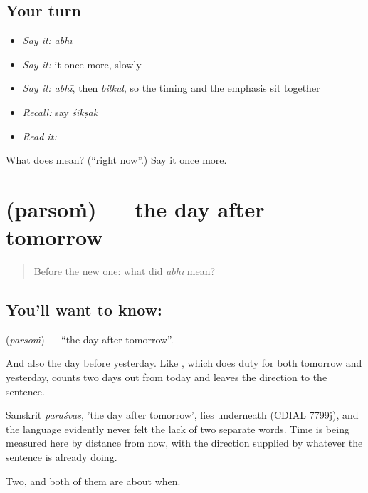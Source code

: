 \subsection*{Your turn}
\begin{itemize}
\raggedright
  \item \emph{Say it:} \emph{abhī}
  \item \emph{Say it:} it once more, slowly
  \item \emph{Say it:} \emph{abhī}, then \emph{bilkul}, so the timing and the emphasis sit together
  \item \emph{Recall:} say \emph{śikṣak}
  \item \emph{Read it:} \textbf{}
\end{itemize}

\begin{tcolorbox}[breakable,colback=teal!4,colframe=teal!35!black,title={Before you move on}]
What does  mean? (\textquotedblleft{}right now\textquotedblright{}.) Say it once more.
\end{tcolorbox}
\section[\texorpdfstring{\hi{परसों} (parsoṁ)}{परसों (parsoṁ)}]{ (parsoṁ) — the day after tomorrow}

\label{lesson:HI-C49-day-after}



\begin{quote}
Before the new one: what did \emph{abhī} mean?
\end{quote}

\subsection*{You'll want to know: }
\textbf{} (\emph{parsoṁ}) — \textquotedblleft{}the day after tomorrow\textquotedblright{}.

And also the day before yesterday. Like , which does duty for both tomorrow and yesterday,  counts two days out from today and leaves the direction to the sentence.

Sanskrit \emph{paraśvas}, 'the day after tomorrow', lies underneath (CDIAL 7799j), and the language evidently never felt the lack of two separate words. Time is being measured here by distance from now, with the direction supplied by whatever the sentence is already doing.

\begin{grammarlens}[title={What you've built}]
Two, and both of them are about when.
\end{grammarlens}

